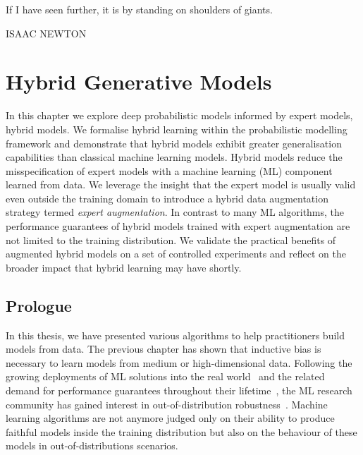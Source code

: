 \null\vfill
{\centering
\parbox{\textwidth}{%
  \raggedright
  {%

   If I have seen further, it is by standing on shoulders of giants.\par\bigskip
  }
  \raggedleft\MakeUppercase{Isaac Newton}\par%
}}

\vfill\vfill

\chapter{Hybrid Generative Models}\label{ch:07}

\begin{chapter_outline}

In this chapter we explore deep probabilistic models informed by expert models, hybrid models.
We formalise hybrid learning within the probabilistic modelling framework and demonstrate that hybrid models exhibit greater generalisation capabilities than classical machine learning models.
Hybrid models reduce the misspecification of expert models with a machine learning (ML) component learned from data. We leverage the insight that the expert model is usually valid even outside the training domain to introduce a hybrid data augmentation strategy termed \textit{expert augmentation}. In contrast to many ML algorithms, the performance guarantees of hybrid models trained with expert augmentation are not limited to the training distribution. We validate the practical benefits of augmented hybrid models on a set of controlled experiments and reflect on the broader impact that hybrid learning may have shortly.

\end{chapter_outline}

\section{Prologue}
In this thesis, we have presented various algorithms to help practitioners build models from data. The previous chapter has shown that inductive bias is necessary to learn models from medium or high-dimensional data. Following the growing deployments of ML solutions into the real world~\citep{wehenkel1998automatic} and the related demand for performance guarantees throughout their lifetime~\citep{lwakatare2020large}, the ML research community has gained interest in out-of-distribution robustness~\citep{sehwag2019analyzing, hendrycks2021many}. Machine learning algorithms are not anymore judged only on their ability to produce faithful models inside the training distribution but also on the behaviour of these models in out-of-distributions scenarios.

